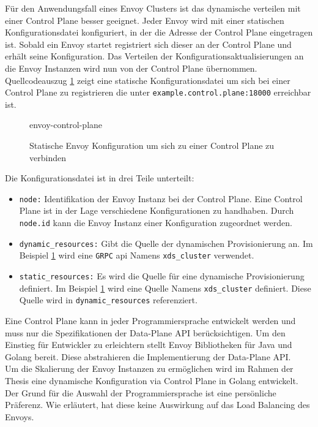 Für den Anwendungsfall eines Envoy Clusters ist das dynamische verteilen mit einer Control Plane besser geeignet. Jeder Envoy wird mit einer statischen Konfigurationsdatei konfiguriert, in der die Adresse der Control Plane eingetragen ist. Sobald ein Envoy startet registriert sich dieser an der Control Plane und erhält seine Konfiguration. Das Verteilen der Konfigurationsaktualisierungen an die Envoy Instanzen wird nun von der Control Plane übernommen.
\\
Quellcodeauszug \ref{code:envoy-control-plane} zeigt eine statische Konfigurationsdatei um sich bei einer Control Plane zu registrieren die unter \verb|example.control.plane:18000| erreichbar ist.
\begin{figure}
    {envoy-control-plane}
    \caption{Statische Envoy Konfiguration um sich zu einer Control Plane zu verbinden}
    \label{code:envoy-control-plane}
\end{figure}
Die Konfigurationsdatei ist in drei Teile unterteilt:
\begin{itemize}
  \item \verb|node:| Identifikation der Envoy Instanz bei der Control Plane. Eine Control Plane ist in der Lage verschiedene Konfigurationen zu handhaben. Durch \verb|node.id| kann die Envoy Instanz einer Konfiguration zugeordnet werden.
  \item \verb|dynamic_resources:| Gibt die Quelle der dynamischen Provisionierung an. Im Beispiel \ref{code:envoy-control-plane} wird eine \verb|GRPC| \ac{api} Namens \verb|xds_cluster| verwendet.
  \item \verb|static_resources:| Es wird die Quelle für eine dynamische Provisionierung definiert. Im Beispiel \ref{code:envoy-control-plane} wird eine Quelle Namens \verb|xds_cluster| definiert. Diese Quelle wird in \verb|dynamic_resources| referenziert.
\end{itemize}
Eine Control Plane kann in jeder Programmiersprache entwickelt werden und muss nur die Spezifikationen der Data-Plane API \cite{EnvoyproxyDataplaneapi2021} berücksichtigen. Um den Einstieg für Entwickler zu erleichtern stellt Envoy Bibliotheken für Java und Golang bereit. Diese abstrahieren die Implementierung der Data-Plane API.
\\
Um die Skalierung der Envoy Instanzen zu ermöglichen wird im Rahmen der Thesis eine dynamische Konfiguration via Control Plane in Golang entwickelt. Der Grund für die Auswahl der Programmiersprache ist eine persönliche Präferenz. Wie erläutert, hat diese keine Auswirkung auf das Load Balancing des Envoys.

